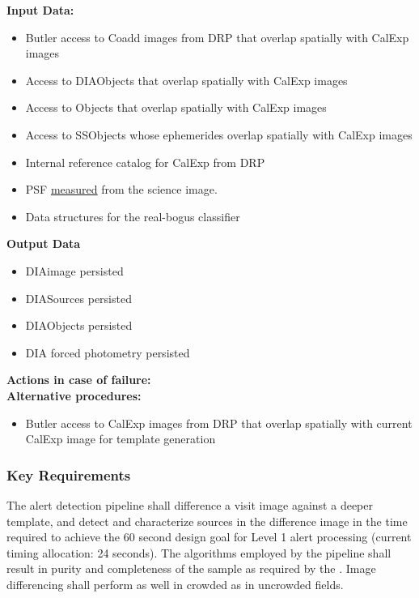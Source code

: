 \noindent 
{\bf Input Data:}\\
\begin{itemize}
\item Butler access to Coadd images from DRP that overlap spatially
  with CalExp images 
\item Access to DIAObjects that overlap spatially with CalExp images 
\item Access to Objects that overlap spatially  with CalExp images 
\item Access to SSObjects whose ephemerides overlap spatially  with CalExp images 
\item Internal reference catalog for CalExp from DRP 
\item PSF \hyperref[sec:apSingleFrameProcessing]{measured} from the
  science image.
\item Data structures for the real-bogus classifier
\end{itemize}


{\bf Output Data}\\
\begin{itemize}
\item DIAimage persisted
\item DIASources persisted
\item DIAObjects persisted
\item DIA forced photometry persisted
\end{itemize}

{\bf Actions in case of failure:}\\
{\bf Alternative procedures:}\\
\begin{itemize}
\item Butler access to CalExp images from DRP that overlap spatially
  with current CalExp image  for template generation
\end{itemize}
\subsubsection{Key Requirements}

The alert detection pipeline shall difference a visit image against a deeper template, and detect and characterize sources in the difference image in the time required to achieve the 60 second design goal for Level 1 alert processing (current timing allocation: 24 seconds). The algorithms employed by the pipeline shall result in purity and completeness of the sample as required by the \DMSR\@. Image differencing shall perform as well in crowded as in uncrowded fields.

